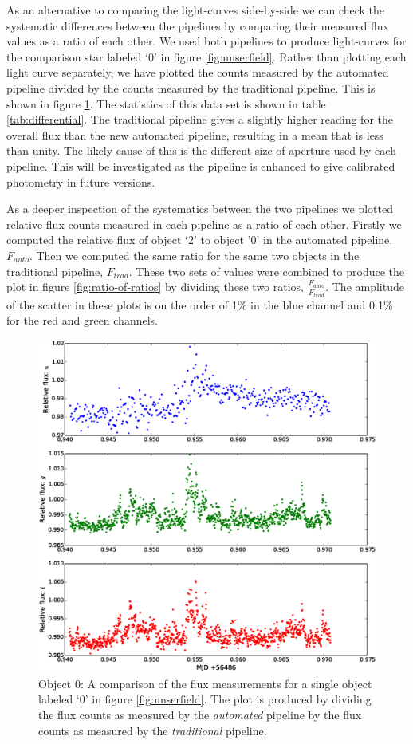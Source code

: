 As an alternative to comparing the light-curves side-by-side we can check the systematic differences between the pipelines by comparing their measured flux values as a ratio of each other. We used both pipelines to produce light-curves for the comparison star labeled `0' in figure \ref{fig:nnserfield}. Rather than plotting each light curve separately, we have plotted the counts measured by the automated pipeline divided by the counts measured by the traditional pipeline. This is shown in figure \ref{fig:comparephotometry}. The statistics of this data set is shown in table \ref{tab:differential}. The traditional pipeline gives a slightly higher reading for the overall flux than the new automated pipeline, resulting in a mean that is less than unity. The likely cause of this is the different size of aperture used by each pipeline. This will be investigated as the pipeline is enhanced to give calibrated photometry in future versions. 

As a deeper inspection of the systematics between the two pipelines we plotted relative flux counts measured in each pipeline as a ratio of each other. Firstly we computed the relative flux of object `2' to object '0' in the automated pipeline, $F_{auto}$. Then we computed the same ratio for the same two objects in the traditional pipeline, $F_{trad}$. These two sets of values were combined to produce the plot in figure \ref{fig:ratio-of-ratios} by dividing these two ratios, $\frac{F_{auto}}{F_{trad}}$. The amplitude of the scatter in these plots is on the order of 1\% in the blue channel and 0.1\% for the red and green channels. 

\begin{figure}
\centering
\includegraphics[width=140mm]{images/compare_photometry.eps}
\caption{Object 0: A comparison of the flux measurements for a single object labeled `0' in figure \ref{fig:nnserfield}. The plot is produced by dividing the flux counts as measured by the \emph{automated} pipeline by the flux counts as measured by the \emph{traditional} pipeline.}
\label{fig:comparephotometry}
\end{figure}


